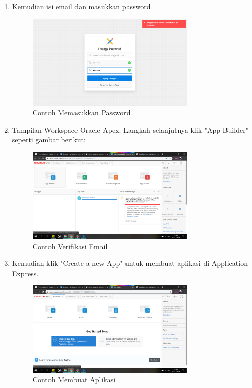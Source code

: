 \begin{enumerate}
\item Kemudian isi email dan masukkan password.
    \begin{figure}[!htbp]
    \centering
    \includegraphics[width=8cm]{picture/16.png}
    \caption{Contoh Memasukkan Password}
    \end{figure}
    
\item Tampilan Workspace Oracle Apex. Langkah selanjutnya klik "App Builder" seperti gambar berikut:
    \begin{figure}[!htbp]
    \centering
    \includegraphics[width=8cm]{picture/17.png}
    \caption{Contoh Verifikasi Email}
    \end{figure}
    
\newpage
\item Kemudian klik "Create a new App" untuk membuat aplikasi di Application Express.
    \begin{figure}[!htbp]
    \centering
    \includegraphics[width=8cm]{picture/18.png}
    \caption{Contoh Membuat Aplikasi}
    \end{figure}
    

\end{enumerate}
